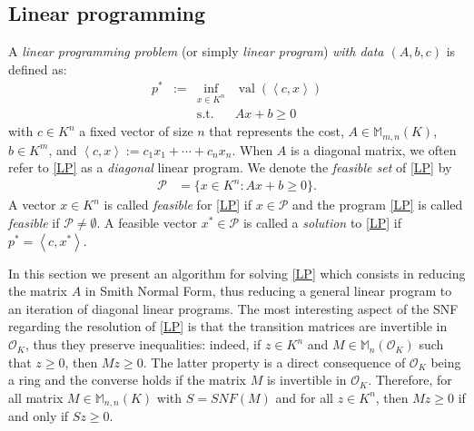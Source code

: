 \documentclass[a4paper,12pt]{article}
\newcommand{\allmat}{\mathbb{M}} %
\newcommand{\PP}{\mathcal{P}}
\DeclareMathOperator{\val}{val}
\newcommand{\OK}{\mathcal{O}_K}
\begin{document}
\subsection{Linear programming}

A \emph{linear programming problem} (or simply \emph{linear program}) \emph{with data $(A,b,c)$} is defined
as:
\begin{equation}
  \tag{LP}\label{LP}
\begin{array}{rcll}
  p^* & := & \inf_{x \in K^n} & \val(\left\langle c, x \right\rangle) \\
  &    & \text{s.t.}         & A x + b \geq 0
\end{array}
\end{equation}
with $c \in K^n$ a fixed vector of size $n$ that represents the cost, $A \in \allmat_{m,n}(K)$, $b \in K^m$,
and $\left\langle c, x \right\rangle := c_1x_1+\cdots +c_nx_n$. When $A$ is a diagonal matrix, we often
refer to \eqref{LP} as a \emph{diagonal} linear program. We denote the \emph{feasible set} of \eqref{LP} by
\begin{equation*}
\begin{aligned}
  \PP  &= \{x \in K^n : Ax + b \geq 0\}.
\end{aligned}
\end{equation*}
A vector $x \in K^n$ is called \emph{feasible} for \eqref{LP} if $x \in \PP$ and the program \eqref{LP} is
called \emph{feasible} if $\PP \neq \emptyset$. A feasible vector $x^* \in \PP$
is called a \emph{solution} to \eqref{LP} if $p^* = \left\langle c,x^*\right\rangle$.

In this section we present an algorithm for solving \eqref{LP} which consists in reducing the matrix $A$ in
Smith Normal Form,
thus reducing a general linear program to an iteration of diagonal linear programs.
The most interesting aspect of the SNF regarding the resolution of \eqref{LP} is that the transition matrices are
invertible in $\OK$, thus they preserve inequalities: indeed, if $z \in K^n$ and $M \in \allmat_n(\OK)$ such
that $z \geq 0$, then $Mz \geq 0$.
The latter property is a direct consequence of $\OK$ being a ring and the converse holds if the matrix $M$ is
invertible in $\OK$. Therefore, for all matrix $M \in \allmat_{n,n}(K)$ with $S=SNF(M)$ and for all $z \in K^n$,
then $Mz \geq 0$ if and only if $Sz \geq 0$.
\end{document}
